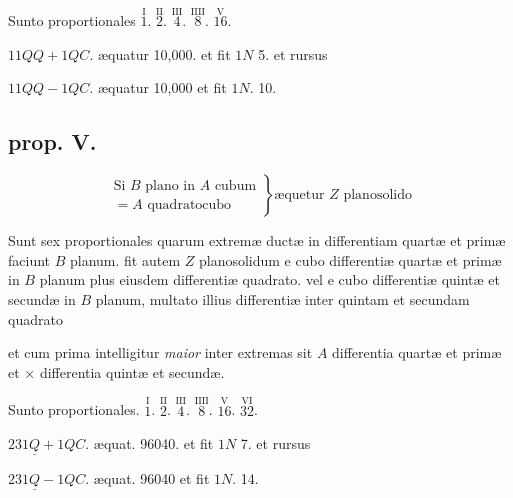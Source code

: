 \documentclass[11pt,a4paper]{article}
\begin{document}
Sunto proportionales $\overset{\text{I}}{1}$. $\overset{\text{II}}{2}$. $\overset{\text{III}}{4}$. $\overset{\text{IIII}}{8}$. $\overset{\text{V}}{16}$.

$11QQ + 1QC$. æquatur 10,000. et fit $1N$ 5. et rursus

$11QQ - 1QC$. æquatur 10,000 et fit $1N$. 10.

\subsection*{prop. V.}

\[ \left. \begin{array}{l} \text{Si } B \text{ plano in } A \text{ cubum} \\ = A \text{ quadratocubo} \end{array} \right\} \text{æquetur } Z \text{ planosolido} \]

Sunt sex proportionales quarum extremæ ductæ in differentiam quartæ et primæ faciunt $B$ planum. fit autem $Z$ planosolidum e cubo differentiæ quartæ et primæ in $B$ planum plus eiusdem differentiæ quadrato. vel e cubo differentiæ quintæ et secundæ in $B$ planum, multato illius differentiæ inter quintam et secundam quadrato

et cum prima intelligitur \emph{maior} inter extremas sit $A$ differentia quartæ et primæ et × differentia quintæ et secundæ.

Sunto proportionales. $\overset{\text{I}}{1}$. $\overset{\text{II}}{2}$. $\overset{\text{III}}{4}$. $\overset{\text{IIII}}{8}$. $\overset{\text{V}}{16}$. $\overset{\text{VI}}{32}$.

$231\underline{Q} + 1QC$. æquat. 96040. et fit $1N$ 7. et rursus

$231\underline{Q} - 1QC$. æquat. 96040 et fit $1N$. 14.
\end{document}
